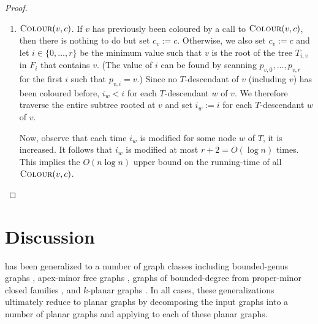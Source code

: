 \documentclass[kpfonts]{patmorin}
\begin{document}
\begin{proof}
\begin{enumerate}
     \item $\textsc{Colour}(v,c)$. If $v$ has previously been coloured by a call to $\textsc{Colour}(v,c)$, then there is nothing to do but set $c_v:=c$.  Otherwise, we also set $c_v:=c$ and let $i\in\{0,\ldots,r\}$ be the minimum value such that $v$ is the root of the tree $T_{i,v}$ in $F_i$ that contains $v$.  (The value of $i$ can be found by scanning $p_{v,0},\ldots,p_{v,r}$ for the first $i$ such that $p_{v,i}=v$.)   Since no $T$-descendant of $v$ (including $v$) has been coloured before, $i_w < i$ for each $T$-descendant $w$ of $v$.  We therefore traverse the entire subtree rooted at $v$ and set $i_w:=i$ for each $T$-descendant $w$ of $v$.

     Now, observe that each time $i_w$ is modified for some node $w$ of $T$, it is increased.  It follows that $i_w$ is modified at most $r+2=O(\log n)$ times.  This implies the $O(n\log n)$ upper bound on the running-time of all $\textsc{Colour}(v,c)$. \qedhere
   \end{enumerate}
 \end{proof}

\section{Discussion}

 has been generalized to a number of graph classes including bounded-genus graphs \cite{dujmovic.joret.ea:planar}, apex-minor free graphs \cite{dujmovic.joret.ea:planar}, graphs of bounded-degree from proper-minor closed families \cite{dujmovic.esperet.ea:planar}, and $k$-planar graphs \cite{dujmovic.morin.ea:structure}.  In all cases, these generalizations ultimately reduce to planar graphs by decomposing the input graphs into a number of planar graphs and applying  to each of these planar graphs.
\end{document}
